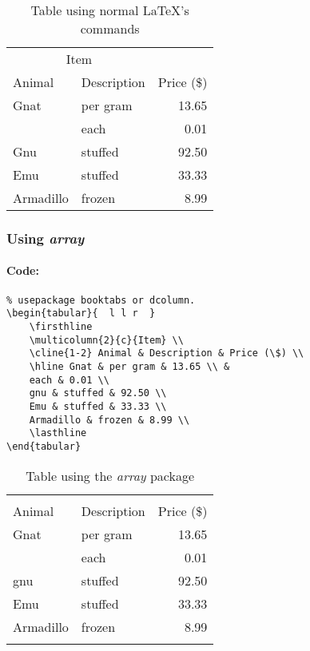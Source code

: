 \begin{table}[htbp]
	\centering
	\begin{tabular}{| l l r |}
		\hline
		\multicolumn{2}{c}{Item} \\
		\cline{1-2} Animal & Description & Price (\$) \\
		\hline
		Gnat & per gram & 13.65 \\
		& each & 0.01 \\
		Gnu & stuffed & 92.50 \\
		Emu & stuffed & 33.33 \\
		Armadillo & frozen & 8.99 \\
		\hline
	\end{tabular}
	\caption{Table using normal \LaTeX{}'s commands}
	\label{nomarllatex}
\end{table}

\subsubsection{Using \emph{array}}
\paragraph{Code:}
\begin{verbatim}
% usepackage booktabs or dcolumn.
\begin{tabular}{  l l r  }
	\firsthline
	\multicolumn{2}{c}{Item} \\
	\cline{1-2} Animal & Description & Price (\$) \\
	\hline Gnat & per gram & 13.65 \\ &
	each & 0.01 \\
	gnu & stuffed & 92.50 \\
	Emu & stuffed & 33.33 \\
	Armadillo & frozen & 8.99 \\
	\lasthline
\end{tabular}
\end{verbatim}

\begin{table}[htbp]
	\centering
	\begin{tabular}{  l l r  }
	\firsthline
	\multicolumn{2}{c}{Item} \\
	\cline{1-2} Animal & Description & Price (\$) \\
	\hline Gnat & per gram & 13.65 \\ &
	each & 0.01 \\
	gnu & stuffed & 92.50 \\
	Emu & stuffed & 33.33 \\
	Armadillo & frozen & 8.99 \\
	\lasthline
	\end{tabular}
	\caption{Table using the \emph{array} package}
	\label{tablearray}
\end{table}




